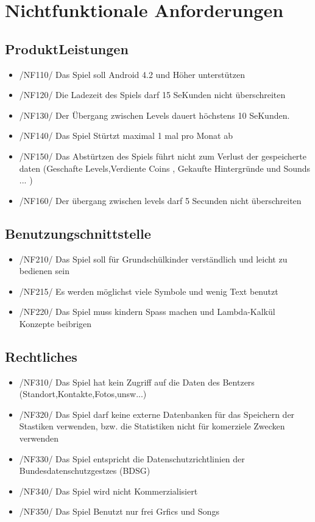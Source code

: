 \section{Nichtfunktionale Anforderungen}

\subsection{ProduktLeistungen}

\begin{itemize}
\item /NF110/ Das Spiel soll Android 4.2 und Höher unterstützen
\item /NF120/ Die Ladezeit des Spiels darf 15 SeKunden nicht über­schrei­ten 
\item /NF130/ Der Übergang zwischen Levels dauert höchstens 10 SeKunden.
\item /NF140/ Das Spiel Stürtzt maximal 1 mal pro Monat ab 
\item /NF150/ Das Abstürtzen des Spiels führt nicht zum Verlust der gespeicherte daten (Geschafte Levels,Verdiente Coins , Gekaufte Hintergründe und Sounds ... )
\item /NF160/ Der übergang zwischen levels  darf 5 Secunden nicht über­schrei­ten
\end{itemize}


\subsection{Benutzungschnittstelle}
\begin{itemize}
\item /NF210/ Das Spiel soll für Grundschülkinder verständlich und leicht zu bedienen sein
\item /NF215/ Es werden möglichst viele Symbole und wenig Text benutzt 
\item /NF220/ Das Spiel  muss kindern Spass machen und Lambda-Kalkül Konzepte beibrigen   
\end{itemize}


\subsection{Rechtliches}
\begin{itemize}
\item /NF310/ Das Spiel hat kein Zugriff auf die Daten des Bentzers (Standort,Kontakte,Fotos,unsw...)
\item /NF320/ Das Spiel darf keine externe Datenbanken für  das Speichern der Stastiken  verwenden, bzw. die Statistiken nicht für komerziele Zwecken verwenden  
\item /NF330/ Das Spiel  entspricht die Datenschutzrichtlinien der Bundesdatenschutzgestzes  (BDSG)
\item /NF340/ Das Spiel wird nicht  Kommerzialisiert
\item /NF350/ Das Spiel Benutzt nur frei Grfics und Songs
\end{itemize}
